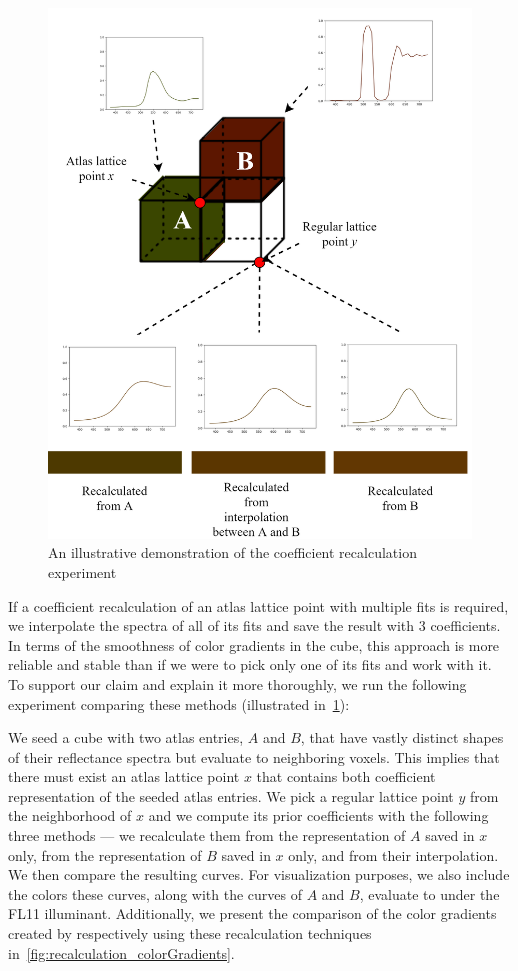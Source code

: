 \begin{figure}[t!]
	\centering
	\captionsetup[subfigure]{font=footnotesize,labelfont=footnotesize}
	\includegraphics[width=0.8\linewidth]{img/recalculation.png}
	\caption{An illustrative demonstration of the coefficient recalculation experiment}
	\label{fig:recalculation_process}
\end{figure}

If a coefficient recalculation of an atlas lattice point with multiple fits is required, we interpolate the spectra of all of its fits and save the result with 3 coefficients. In terms of the smoothness of color gradients in the cube, this approach is more reliable and stable than if we were to pick only one of its fits and work with it. To support our claim and explain it more thoroughly, we run the following experiment comparing these methods (illustrated in~\cref{fig:recalculation_process}):

We seed a cube with two atlas entries, $A$ and $B$, that have vastly distinct shapes of their reflectance spectra but evaluate to neighboring voxels. This implies that there must exist an atlas lattice point $x$ that contains both coefficient representation of the seeded atlas entries. We pick a regular lattice point $y$ from the neighborhood of $x$ and we compute its prior coefficients with the following three methods --- we recalculate them from the representation of $A$ saved in $x$ only, from the representation of $B$ saved in $x$ only, and from their interpolation. We then compare the resulting curves. For visualization purposes, we also include the colors these curves, along with the curves of $A$ and $B$, evaluate to under the FL11 illuminant. Additionally, we present the comparison of the color gradients created by respectively using these recalculation techniques in~\cref{fig:recalculation_colorGradients}.

